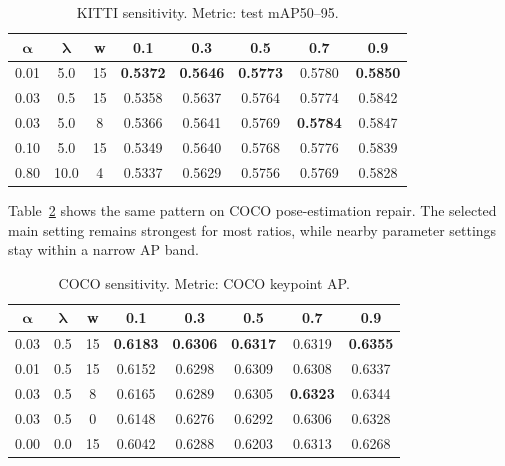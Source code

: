 \begin{table}[h]
\centering
\caption{KITTI \model sensitivity. Metric: test mAP50--95.}
\label{tab:kitti-rpc-sensitivity}
\small
\setlength{\tabcolsep}{4pt}
\begin{tabular}{c c c c c c c c}
\toprule
\rowcolor{sectiongray} $\boldsymbol{\alpha}$ & $\boldsymbol{\lambda}$ & \textbf{w} & \textbf{0.1} & \textbf{0.3} & \textbf{0.5} & \textbf{0.7} & \textbf{0.9} \\
\midrule
0.01 & 5.0 & 15 & \textbf{0.5372} & \textbf{0.5646} & \textbf{0.5773} & 0.5780 & \textbf{0.5850} \\
0.03 & 0.5 & 15 & 0.5358 & 0.5637 & 0.5764 & 0.5774 & 0.5842 \\
0.03 & 5.0 & 8 & 0.5366 & 0.5641 & 0.5769 & \textbf{0.5784} & 0.5847 \\
0.10 & 5.0 & 15 & 0.5349 & 0.5640 & 0.5768 & 0.5776 & 0.5839 \\
0.80 & 10.0 & 4 & 0.5337 & 0.5629 & 0.5756 & 0.5769 & 0.5828 \\
\bottomrule
\end{tabular}
\end{table}

Table~\ref{tab:coco-rpc-sensitivity} shows the same pattern on COCO pose-estimation repair. The selected main setting remains strongest for most ratios, while nearby \model parameter settings stay within a narrow AP band.

\begin{table}[h]
\centering
\caption{COCO \model sensitivity. Metric: COCO keypoint AP.}
\label{tab:coco-rpc-sensitivity}
\small
\setlength{\tabcolsep}{4pt}
\begin{tabular}{c c c c c c c c}
\toprule
\rowcolor{sectiongray} $\boldsymbol{\alpha}$ & $\boldsymbol{\lambda}$ & \textbf{w} & \textbf{0.1} & \textbf{0.3} & \textbf{0.5} & \textbf{0.7} & \textbf{0.9} \\
\midrule
0.03 & 0.5 & 15 & \textbf{0.6183} & \textbf{0.6306} & \textbf{0.6317} & 0.6319 & \textbf{0.6355} \\
0.01 & 0.5 & 15 & 0.6152 & 0.6298 & 0.6309 & 0.6308 & 0.6337 \\
0.03 & 0.5 & 8 & 0.6165 & 0.6289 & 0.6305 & \textbf{0.6323} & 0.6344 \\
0.03 & 0.5 & 0 & 0.6148 & 0.6276 & 0.6292 & 0.6306 & 0.6328 \\
0.00 & 0.0 & 15 & 0.6042 & 0.6288 & 0.6203 & 0.6313 & 0.6268 \\
\bottomrule
\end{tabular}
\end{table}

